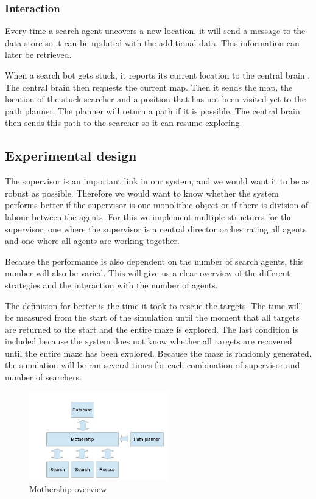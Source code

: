 \subsubsection{Interaction}
Every time a search agent uncovers a new location, it will send a message to
the data store so it can be updated with the additional data. This information
can later be retrieved.

When a search bot gets stuck, it reports its current location to the central
brain . The central brain then requests the current map. Then it sends the
map, the location of the stuck searcher and a position that has not been
visited yet to the path planner. The planner will return a path if it is
possible. The central brain then sends this path to the searcher so it can
resume exploring.

\subsection{Experimental design}
The supervisor is an important link in our system, and we would want it to
be as robust as possible. Therefore we would want to know whether the
system performs better if the supervisor is one monolithic object or if
there is division of labour between the agents. For this we implement
multiple structures for the supervisor, one where the supervisor is a central
director orchestrating all agents and one where all agents are working together.

Because the performance is also dependent on the number of search agents, this
number will also be varied. This will give us a clear overview of the
different strategies and the interaction with the number of agents.

The definition for better is the time it took to rescue the targets.  The
time will be measured from the start of the simulation until the moment that
all targets are returned to the start and the entire maze is explored. The last
condition is included because the system does not know whether all targets
are recovered until the entire maze has been explored. Because the maze is
randomly generated, the simulation will be ran several times for each
combination of supervisor and number of searchers.


\begin{figure}[h]
	\centering
		\includegraphics[width=6cm]{mothership}
	\caption{Mothership overview}
	\label{fig:mothership}
\end{figure}

